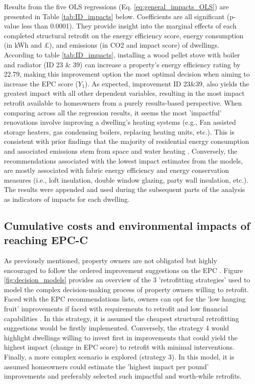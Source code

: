 Results from the five OLS regressions (Eq. \ref{eq:general_impacts_OLS}) are presented in Table \ref{tab:ID_impacts} below. Coefficients are all significant (p-value less than 0.0001).  They provide insight into the marginal effects of each completed structural retrofit on the energy efficiency score, energy consumption (in kWh and £), and emissions (in CO2 and impact score) of dwellings. According to table \ref{tab:ID_impacts}, installing a wood pellet stove with boiler and radiator (ID 23 \& 39) can increase a property’s energy efficiency rating by 22.79, making this improvement option the most optimal decision when aiming to increase the EPC score ($Y_1$). As expected, improvement ID 23\&39, also yields the greatest impact with all other dependent variables, resulting in the most impact retrofit available to homeowners from a purely results-based perspective. When comparing across all the regression results, it seems the most ’impactful’ renovations involve improving a dwelling’s heating systems (e.g., Fan assisted storage heaters,
gas condensing boilers, replacing heating units, etc.). This is consistent with prior findings that the majority of residential energy consumption and associated emissions stem from space and water heating \cite{lowe_technical_2007, kesicki_costs_2012} . Conversely, the recommendations associated with the lowest impact estimates from the models, are mostly associated with fabric energy efficiency and energy conservation measures (i.e., loft insulation, double window glazing, party wall insulation, etc.). The results were appended and used during the subsequent parts of the analysis as indicators of impacts for each dwelling.  


\subsection{Cumulative costs and environmental impacts of reaching EPC-C}

As previously mentioned, property owners are not obligated but highly encouraged to follow the ordered improvement suggestions on the EPC \cite{department_for_communities_and_local_government_guide_2017}. Figure \ref{fig:decision_models} provides an overview of the 3 'retrofitting strategies' used to model the complex decision-making process of property owners willing to retrofit. Faced with the EPC recommendations lists, owners can opt for the 'low hanging fruit' improvements if faced with requirements to retrofit and low financial capabilities \cite{jones_retrofitting_2013}. In this strategy, it is assumed the cheapest structural retrofitting suggestions would be firstly implemented. Conversely, the strategy 4 would highlight dwellings willing to invest first in improvements that could yield the highest impact (change in EPC score) to retrofit with minimal interventions. Finally, a more complex scenario is explored (strategy 3). In this model, it is assumed homeowners could estimate the 'highest impact per pound' improvements and preferably selected such impactful and worth-while retrofits. \\

